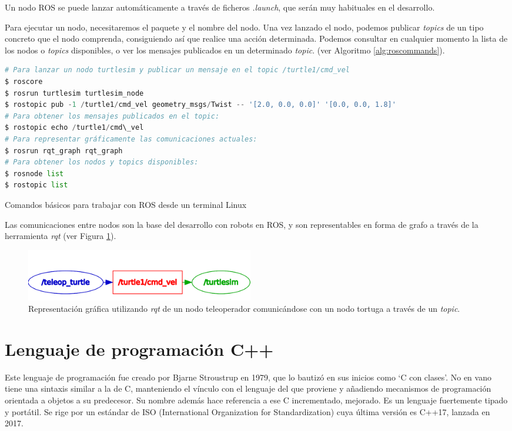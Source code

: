 \documentclass[12pt,spanish,chapterprefix, numbers=noenddot]{book}
\numberwithin{equation}{section}
\numberwithin{figure}{section}
\begin{document}
Un nodo ROS se puede lanzar automáticamente a través de  ficheros \textit{.launch}, que serán muy habituales en el desarrollo. 

Para ejecutar un nodo, necesitaremos el paquete y el nombre del nodo. Una vez lanzado el nodo, podemos publicar \textit{topics} de un tipo concreto que el nodo comprenda, consiguiendo así que realice una acción determinada. Podemos consultar en cualquier momento la lista de los nodos o \textit{topics} disponibles, o ver los mensajes publicados en un determinado \textit{topic}. (ver Algoritmo \ref{alg:roscommands}).

\begin{algorithm}[htb!]
	\begin{lstlisting}[breaklines=true,language=python]
# Para lanzar un nodo turtlesim y publicar un mensaje en el topic /turtle1/cmd_vel
$ roscore
$ rosrun turtlesim turtlesim_node
$ rostopic pub -1 /turtle1/cmd_vel geometry_msgs/Twist -- '[2.0, 0.0, 0.0]' '[0.0, 0.0, 1.8]'
# Para obtener los mensajes publicados en el topic: 
$ rostopic echo /turtle1/cmd\_vel
# Para representar gráficamente las comunicaciones actuales:
$ rosrun rqt_graph rqt_graph
# Para obtener los nodos y topics disponibles: 
$ rosnode list 
$ rostopic list
	\end{lstlisting}
\caption{\label{alg:roscommands}Comandos básicos para trabajar con ROS desde un terminal Linux}
\end{algorithm}

Las comunicaciones entre nodos son la base del desarrollo con robots en ROS, y son representables en forma de grafo a través de la herramienta \textit{rqt} (ver Figura \ref{fig:turtlesim}).

\begin{figure}[hbt!]
\centering
\includegraphics[width=10cm]{Figs/turtle_graph.png}
\par
\caption{\label{fig:turtlesim}Representación gráfica utilizando \textit{rqt} de un nodo teleoperador comunicándose con un nodo tortuga a través de un \textit{topic}.}
\end{figure}

\section{Lenguaje de programación C++}
Este lenguaje de programación fue creado por Bjarne Stroustrup en 1979, que lo bautizó en sus inicios como ‘C con clases’. No en vano tiene una sintaxis similar a la de C, manteniendo el vínculo con el lenguaje del que proviene y añadiendo mecanismos de programación orientada a objetos a su predecesor. Su nombre además hace referencia a ese C incrementado, mejorado. 
Es un lenguaje fuertemente tipado y portátil. Se rige por un estándar de ISO (International Organization for Standardization) cuya última versión es C++17, lanzada en 2017. 
\end{document}
